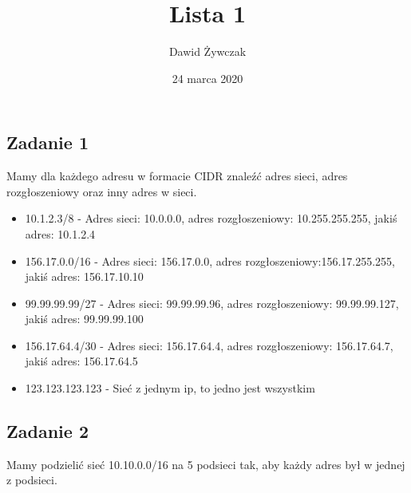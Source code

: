\documentclass[a4paper]{article}
\title{Lista 1}
\author{Dawid Żywczak}
\date{24 marca 2020}
\begin{document}
\maketitle
\subsection*{Zadanie 1}
Mamy dla każdego adresu w formacie CIDR znaleźć adres sieci, adres rozgłoszeniowy oraz inny adres w sieci.

\begin{itemize}
\item 10.1.2.3/8 - Adres sieci: 10.0.0.0, adres rozgłoszeniowy: 10.255.255.255, jakiś adres: 10.1.2.4
\item 156.17.0.0/16 - Adres sieci: 156.17.0.0, adres rozgłoszeniowy:156.17.255.255, jakiś adres: 156.17.10.10
\item 99.99.99.99/27 - Adres sieci: 99.99.99.96, adres rozgłoszeniowy: 99.99.99.127, jakiś adres: 99.99.99.100
\item 156.17.64.4/30 - Adres sieci: 156.17.64.4, adres rozgłoszeniowy: 156.17.64.7, jakiś adres: 156.17.64.5
\item 123.123.123.123 - Sieć z jednym ip, to jedno jest wszystkim
\end{itemize}

\subsection*{Zadanie 2}
Mamy podzielić sieć 10.10.0.0/16 na 5 podsieci tak, aby każdy adres był w jednej z podsieci.
\end{document}
